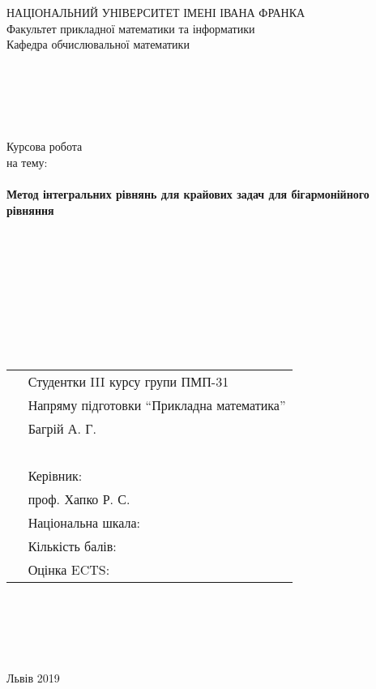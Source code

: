 \documentclass[12pt]{report}
\begin{document}
\begin{titlepage}
		\begin{center}
			{ НАЦІОНАЛЬНИЙ УНІВЕРСИТЕТ ІМЕНІ ІВАНА ФРАНКА}\\
			{\Large Факультет прикладної математики та інформатики \\
			 Кафедра обчислювальної математики}
		\end{center}
	    \leavevmode \\
	    \leavevmode \\
	    \leavevmode \\
	    \leavevmode \\
		\begin{center}
			{\LARGE  Курсова робота\\}
			 на тему: \\
			\leavevmode \\
		    {\Huge \textbf{Метод інтегральних рівнянь для крайових задач для бігармонійного рівняння}}			
		\end{center}
	    \leavevmode \\
	    \leavevmode \\
	    \leavevmode \\
	    \leavevmode \\	
	    \leavevmode \\
	    \leavevmode \\
	    \leavevmode \\
	    \leavevmode \\     
	        \begin{tabular}{p{7cm}p{12cm}}
	    	    \, & {\large Студентки III курсу групи ПМП-31} \\
	    	    \, & {\large Напряму підготовки ``Прикладна математика''} \\
	    	    \, & {\large Багрій А. Г.} \\
	    	    \, & \, \\
	    	    \, & {\large Керівник:} \\
	    	    \, & {\large проф. Хапко Р. С.} \\
	    	    \, & {\large Національна шкала: \underline{\hspace{3cm}}} \\
	    	    \, & {\large Кількість балів: \underline{\hspace{3cm}}} \\
		    \, & {\large Оцінка ECTS: \underline{\hspace{3cm}}}
	        \end{tabular}
        \leavevmode \\
        \leavevmode \\
        \leavevmode \\
        \leavevmode \\
        \vfill
        \begin{center}
        	{\Large Львів 2019}
        \end{center}
\end{titlepage}
\end{document}
